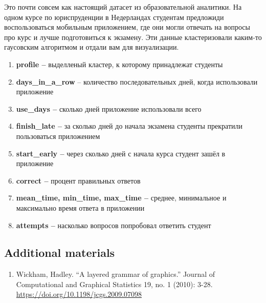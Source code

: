 \documentclass[
]{article}
\providecommand{\tightlist}{%
  \setlength{\itemsep}{0pt}\setlength{\parskip}{0pt}}
\begin{document}
Это почти совсем как настоящий датасет из образовательной аналитики. На
одном курсе по юриспруденции в Недерландах студентам предложиди
воспользоваться мобильным приложением, где они могли отвечать на вопросы
про курс и лучше подготовиться к экзамену. Эти данные кластеризовали
каким-то гаусовским алгоритмом и отдали вам для визуализации.

\begin{enumerate}
\def\labelenumi{\arabic{enumi}.}
\tightlist
\item
  \textbf{profile --} выделленый кластер, к которому принадлежат
  студенты
\item
  \textbf{days\_in\_a\_row} -- количество последовательных дней, когда
  использовали приложение
\item
  \textbf{use\_days --} сколько дней приложение использовали всего
\item
  \textbf{finish\_late --} за сколько дней до начала экзамена студенты
  прекратили пользоваться приложением
\item
  \textbf{start\_early --} через сколько дней с начала курса студент
  зашёл в приложение
\item
  \textbf{correct --} процент правильных ответов
\item
  \textbf{mean\_time, min\_time, max\_time --} среднее, минимальное и
  максимально время ответа в приложении
\item
  \textbf{attempts --} насколько вопросов попробовал ответить студент
\end{enumerate}

\hypertarget{additional-materials}{%
\subsection{Additional materials}\label{additional-materials}}

\begin{enumerate}
\def\labelenumi{\arabic{enumi}.}
\tightlist
\item
  Wickham, Hadley. ``A layered grammar of graphics.'' Journal of
  Computational and Graphical Statistics 19, no. 1 (2010): 3-28.
  \url{https://doi.org/10.1198/jcgs.2009.07098}
\end{enumerate}
\end{document}
